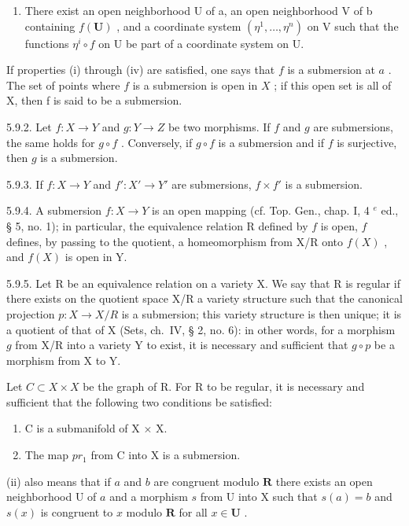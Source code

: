 \begin{enumerate}
\def\labelenumi{(\alph{enumi})}
\setcounter{enumi}{21}
\tightlist
\item
  There exist an open neighborhood U of a, an open neighborhood V of b containing \(f(\mathbf{U})\) , and a coordinate system \((\eta^{1},\ldots,\eta^{n})\) on V such that the functions \(\eta^{i}\circ f\) on U be part of a coordinate system on U.
\end{enumerate}

If properties (i) through (iv) are satisfied, one says that \(f\) is a submersion at \(a\) . The set of points where \(f\) is a submersion is open in \(X\) ; if this open set is all of X, then f is said to be a submersion.

5.9.2. Let \(f: X \to Y\) and \(g: Y \to Z\) be two morphisms. If \(f\) and \(g\) are submersions, the same holds for \(g \circ f\) . Conversely, if \(g \circ f\) is a submersion and if \(f\) is surjective, then \(g\) is a submersion.

5.9.3. If \(f: X \to Y\) and \(f': X' \to Y'\) are submersions, \(f \times f'\) is a submersion.

5.9.4. A submersion \(f: X \to Y\) is an open mapping (cf. Top. Gen., chap. I, 4 \(^{e}\) ed., § 5, no. 1); in particular, the equivalence relation R defined by \(f\) is open, \(f\) defines, by passing to the quotient, a homeomorphism from X/R onto \(f(X)\) , and \(f(X)\) is open in Y.

5.9.5. Let R be an equivalence relation on a variety X. We say that R is regular if there exists on the quotient space X/R a variety structure such that the canonical projection \(p: X \to X/R\) is a submersion; this variety structure is then unique; it is a quotient of that of X (Sets, ch.~IV, § 2, no. 6): in other words, for a morphism \(g\) from X/R into a variety Y to exist, it is necessary and sufficient that \(g \circ p\) be a morphism from X to Y.

Let \(C \subset X \times X\) be the graph of R. For R to be regular, it is necessary and sufficient that the following two conditions be satisfied:

\begin{enumerate}
\def\labelenumi{(\roman{enumi})}
\item
  C is a submanifold of X × X.
\item
  The map \(pr_{1}\) from C into X is a submersion.
\end{enumerate}

(ii) also means that if \(a\) and \(b\) are congruent modulo \(\mathbf{R}\) there exists an open neighborhood U of \(a\) and a morphism \(s\) from U into X such that \(s(a) = b\) and \(s(x)\) is congruent to \(x\) modulo \(\mathbf{R}\) for all \(x \in \mathbf{U}\) .

